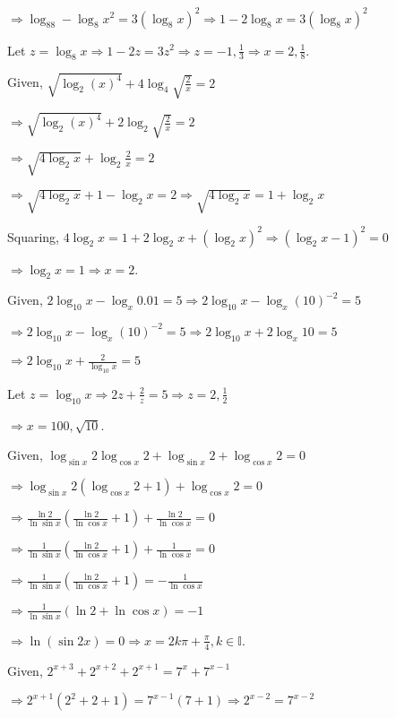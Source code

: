   $\Rightarrow \log_88 - \log_8x^2 = 3(\log_8x)^2 \Rightarrow 1 - 2\log_8x = 3(\log_8x)^2$

  Let $z = \log_8x\Rightarrow 1 - 2z = 3z^2 \Rightarrow z = -1, \frac{1}{3}\Rightarrow x = 2, \frac{1}{8}$.
\item Given, $\sqrt{\log_2(x)^4} + 4\log_4\sqrt{\tfrac{2}{x}} = 2$

  $\Rightarrow \sqrt{\log_2(x)^4} + 2\log_2\sqrt{\tfrac{2}{x}} = 2$

  $\Rightarrow \sqrt{4\log_2x} + \log_2\tfrac{2}{x} = 2$

  $\Rightarrow \sqrt{4\log_2x} + 1 - \log_2x = 2 \Rightarrow \sqrt{4\log_2x} = 1 + \log_2x$

  Squaring, $4\log_2x = 1 + 2\log_2x + (\log_2x)^2 \Rightarrow (\log_2x - 1)^2 = 0$

  $\Rightarrow \log_2x = 1 \Rightarrow x = 2$.
\item Given, $2\log_{10}x - \log_x0.01 = 5 \Rightarrow 2\log_{10}x - \log_x(10)^{-2} = 5$

  $\Rightarrow 2\log_{10}x - \log_x(10)^{-2} = 5 \Rightarrow 2\log_{10}x + 2\log_x10 = 5$

  $\Rightarrow 2\log_{10}x + \frac{2}{\log_{10}x} = 5$

  Let $z = \log_{10}x \Rightarrow 2z + \frac{2}{z} = 5 \Rightarrow z = 2, \frac{1}{2}$

  $\Rightarrow x = 100, \sqrt{10}$.
\item Given, $\log_{\sin x}2\log_{\cos x}2 + \log_{\sin x}2 + \log_{\cos x}2 = 0$

  $\Rightarrow \log_{\sin x}2(\log_{\cos x}2 + 1) + \log_{\cos x}2 = 0$

  $\Rightarrow \frac{\ln 2}{\ln \sin x}\left(\frac{\ln 2}{\ln \cos x} + 1\right) + \frac{\ln 2}{\ln \cos x} = 0$

  $\Rightarrow \frac{1}{\ln \sin x}\left(\frac{\ln 2}{\ln \cos x} + 1\right) + \frac{1}{\ln \cos x} = 0$

  $\Rightarrow \frac{1}{\ln \sin x}\left(\frac{\ln 2}{\ln \cos x} + 1\right) = -\frac{1}{\ln \cos x}$

  $\Rightarrow \frac{1}{\ln \sin x}(\ln 2 + \ln\cos x) = -1$

  $\Rightarrow \ln(\sin2x) = 0\Rightarrow x = 2k\pi + \frac{\pi}{4}, k\in\mathbb{I}$.
\item Given, $2^{x + 3} + 2^{x+2} + 2^{x + 1} = 7^x + 7^{x - 1}$

  $\Rightarrow 2^{x + 1}(2^2 + 2 + 1) = 7^{x - 1}(7 + 1) \Rightarrow 2^{x - 2} = 7^{x - 2}$

